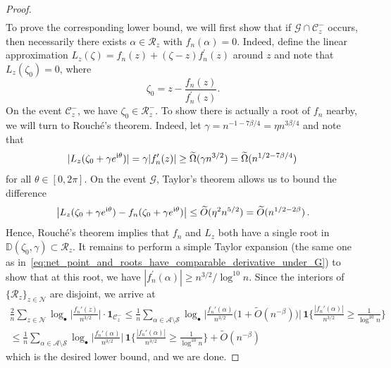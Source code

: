 \documentclass[11pt]{amsart}
\theoremstyle{remark}
\theoremstyle{definition}
\newcommand{\cR}{\mathcal R}
\newcommand{\bD}{\mathbb D}
\newcommand{\cA}{\mathcal A}
\newcommand{\cC}{\mathcal C}
\newcommand{\cN}{\mathcal N}
\newcommand{\cG}{\mathcal G}
\newcommand{\I}{{\rm i}}
\newcommand{\one}{\boldsymbol{1}}
\begin{document}
\begin{proof}
\begin{align*}
            \end{align*}
            To prove the corresponding lower bound, we will first show that if $\cG\cap \cC_z^-$ occurs, then necessarily there exists $\alpha\in \cR_z$ with $f_n(\alpha) = 0$. Indeed, define the linear approximation $L_z(\zeta) = f_n(z) + (\zeta-z)f_n^\prime(z)$ around $z$ and note that $L_z(\zeta_0) = 0$, where
            \[
            \zeta_0 = z-\frac{f_n(z)}{f_n^\prime(z)}. 
            \]
            On the event $\cC_z^-$, we have $\zeta_0\in \cR_z^-$. To show there is actually a root of $f_n$ nearby, we will turn to Rouch\'e's theorem. Indeed, let $\gamma = n^{-1-7\beta/4} = \eta n^{3\beta/4} $ and note that 
            \[
            |L_z(\zeta_0 + \gamma e^{\I\theta} )| = \gamma |f_n^\prime(z)| \ge \widetilde{\Omega}(\gamma n^{3/2}) = \widetilde{\Omega}(n^{1/2 - 7\beta/4}) \, 
            \]
            for all $\theta\in[0,2\pi]$. On the event $\cG$, Taylor's theorem allows us to bound the difference
            \[
            \big| L_z(\zeta_0 + \gamma e^{\I\theta} ) -f_n(\zeta_0 +\gamma e^{\I\theta}) \big| \le \widetilde{O}(\eta^2 n^{5/2}) = \widetilde{O}(n^{1/2-2\beta}) \, .
            \]
            Hence, Rouch\'e's theorem implies that $f_n$ and $L_z$ both have a single root in $\bD(\zeta_0,\gamma)\subset \cR_z$. It remains to perform a simple Taylor expansion (the same one as in~\eqref{eq:net_point_and_roots_have_comparable_derivative_under_G}) to show that at this root, we have $|f_n^\prime(\alpha)|\ge n^{3/2}/\log^{10}n$. Since the interiors of $\{\cR_z\}_{z\in \cN}$ are disjoint, we arrive at
            \begin{multline*}
                \frac{2}{n} \sum_{z \in \cN}  \log_\bullet\Big|\frac{f_n'(z)}{n^{3/2}} \Big| \cdot  \one_{\cC_z^-} \le \frac{1}{n} \sum_{\alpha \in \cA\setminus \mathcal{S}} \log_\bullet\Big|\frac{f_n'(\alpha)}{n^{3/2}}\big(1+\widetilde{O}(n^{-\beta})\big) \Big| \,  \one\Big\{\frac{|f_n'(\alpha)|}{n^{3/2}} \geq \frac{1}{\log^{10}n}  \Big\}  \\ \le \frac{1}{n} \sum_{\alpha \in \cA\setminus \mathcal{S}} \log_\bullet\Big|\frac{f_n'(\alpha)}{n^{3/2}}\Big| \,  \one\Big\{\frac{|f_n'(\alpha)|}{n^{3/2}} \geq \frac{1}{\log^{10}n}  \Big\} + \widetilde{O}(n^{-\beta})
            \end{multline*}
            which is the desired lower bound, and we are done. 
    \end{proof}
    
\end{document}
